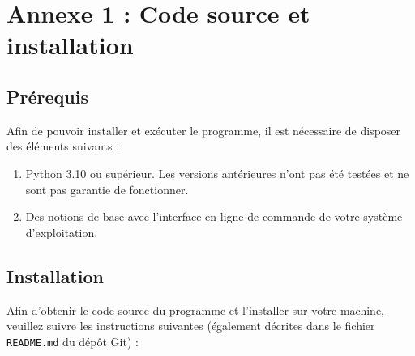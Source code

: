 \documentclass[12pt]{scrreprt} %
\begin{document}
\section*{Annexe 1 : Code source et installation}

\subsection*{Prérequis}

Afin de pouvoir installer et exécuter le programme, il est nécessaire de disposer des éléments suivants :
\begin{enumerate}
    \item Python 3.10 ou supérieur. Les versions antérieures n'ont pas été testées et ne sont pas garantie de fonctionner.
    \item Des notions de base avec l'interface en ligne de commande de votre système d'exploitation.
\end{enumerate}

\subsection*{Installation}

Afin d'obtenir le code source du programme et l'installer sur votre machine, veuillez suivre les instructions suivantes (également décrites dans le fichier \texttt{README.md} du dépôt Git) :
\end{document}
